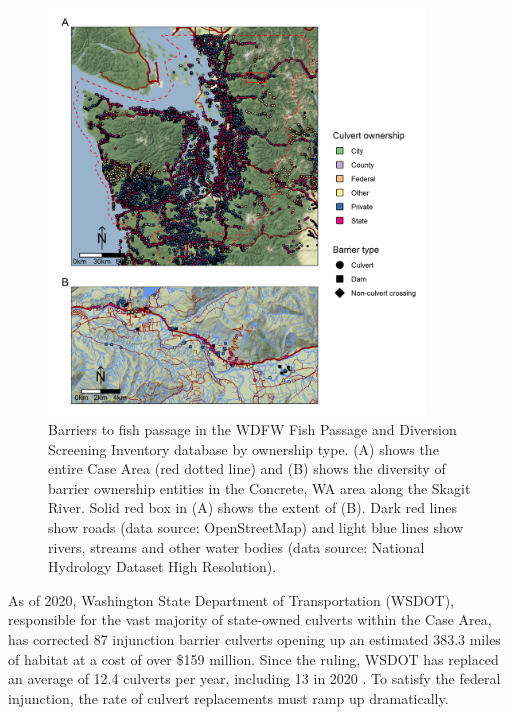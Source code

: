 \documentclass[12pt]{elsarticle}
\begin{document}
\begin{figure}
\includegraphics[width=10cm]{figures/fig_mapconcrete.png}
\caption{Barriers to fish passage in the WDFW Fish Passage and Diversion Screening Inventory database by ownership type. (A) shows the entire Case Area (red dotted line) and (B) shows the diversity of barrier ownership entities in the Concrete, WA area along the Skagit River. Solid red box in (A) shows the extent of (B). Dark red lines show roads (data source: OpenStreetMap) and light blue lines show rivers, streams and other water bodies (data source: National Hydrology Dataset High Resolution).\label{fig:barrierMap}}
\end{figure}%

As of 2020, Washington State Department of Transportation (WSDOT), responsible for the vast majority of state-owned culverts within the Case Area, has corrected 87 injunction barrier culverts opening up an estimated 383.3 miles of habitat at a cost of over \$159 million. Since the ruling, WSDOT has replaced an average of 12.4 culverts per year, including 13 in 2020 \citep{noauthor_wsdot_2020}. To satisfy the federal injunction, the rate of culvert replacements must ramp up dramatically. 
\end{document}
